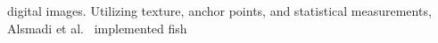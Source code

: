 \documentclass[conference]{IEEEtran}
\begin{document}
digital images.
Utilizing texture, anchor points, and statistical measurements,
Alsmadi et al.~\cite{Alsmadi2019RFE} implemented fish
\end{document}
